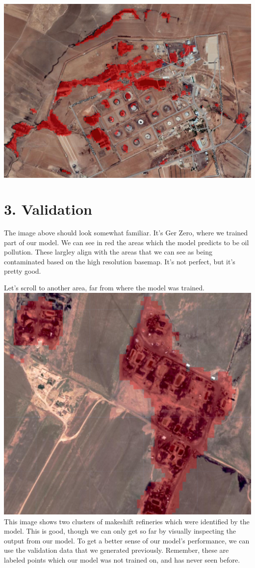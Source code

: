 \documentclass[
  letterpaper,
  DIV=11,
  numbers=noendperiod]{scrreprt}
\begin{document}
\includegraphics{./images/ger_zero_pred.png}

\hypertarget{validation}{%
\section*{3. Validation}\label{validation}}


The image above should look somewhat familiar. It's Ger Zero, where we
trained part of our model. We can see in red the areas which the model
predicts to be oil pollution. These largley align with the areas that we
can see as being contaminated based on the high resolution basemap. It's
not perfect, but it's pretty good.

Let's scroll to another area, far from where the model was trained.
\includegraphics{./images/small_refinery.png} This image shows two
clusters of makeshift refineries which were identified by the model.
This is good, though we can only get so far by visually inspecting the
output from our model. To get a better sense of our model's performance,
we can use the validation data that we generated previously. Remember,
these are labeled points which our model was not trained on, and has
never seen before.
\end{document}
